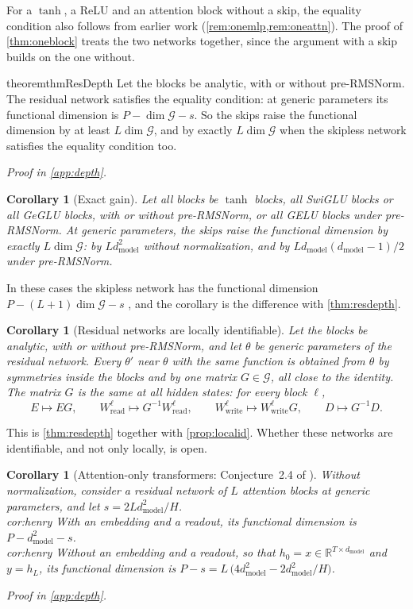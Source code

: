 \documentclass[10pt]{article}
\newtheorem{corollary}[theorem]{Corollary}
\theoremstyle{definition}
\theoremstyle{remark}
\newcommand{\R}{\mathbb{R}}
\newcommand{\Wread}{W_{\mathrm{read}}}
\newcommand{\Wwrite}{W_{\mathrm{write}}}
\newcommand{\dm}{d_{\mathrm{model}}}
\newcommand{\G}{\mathcal{G}}
\newcommand{\ptlabel}[1]{\phantomsection\label{#1}}
\newcommand{\proofin}[1]{\par\vspace{-0.4\baselineskip}\noindent\hfill{\small\itshape Proof in \cref{#1}.}\par\smallskip}
\newcommand{\stpart}[3]{\ifx\relax#1\relax\else\ptlabel{#1:#2}\fi{\upshape\bfseries\boldmath(#2)\ifx\relax#3\relax\else\ #3.\fi}}
\newcommand{\KDdepth}{5.2}    %
\begin{document}
For a $\tanh$, a ReLU and an attention block without a skip, the equality condition also follows from earlier work (\cref{rem:onemlp,rem:oneattn}). The proof of \cref{thm:oneblock} treats the two networks together, since the argument with a skip builds on the one without.

\begin{restatable}{theorem}{thmResDepth}\label{thm:resdepth}
Let the blocks be analytic, with or without pre-RMSNorm. The residual network satisfies the equality condition: at generic parameters its functional dimension is $P - \dim\G - s$. So the skips raise the functional dimension by at least $L\dim\G$, and by exactly $L\dim\G$ when the skipless network satisfies the equality condition too.
\end{restatable}
\proofin{app:depth}

\begin{corollary}[Exact gain]\label{cor:exactgain}
Let all blocks be $\tanh$ blocks, all SwiGLU blocks or all GeGLU blocks, with or without pre-RMSNorm, or all GELU blocks under pre-RMSNorm. At generic parameters, the skips raise the functional dimension by exactly $L\dim\G$: by $L\dm^2$ without normalization, and by $L\dm(\dm-1)/2$ under pre-RMSNorm.
\end{corollary}

In these cases the skipless network has the functional dimension $P - (L+1)\dim\G - s$ \citep[Theorem~\KDdepth]{karbevski2026dimension}, and the corollary is the difference with \cref{thm:resdepth}.

\begin{corollary}[Residual networks are locally identifiable]\label{cor:localid}
Let the blocks be analytic, with or without pre-RMSNorm, and let $\theta$ be generic parameters of the residual network. Every $\theta'$ near $\theta$ with the same function is obtained from $\theta$ by symmetries inside the blocks and by one matrix $G \in \G$, all close to the identity. The matrix $G$ is the same at all hidden states: for every block $\ell$,
\[
E \mapsto EG, \qquad \Wread^{\ell} \mapsto G^{-1}\Wread^{\ell}, \qquad \Wwrite^{\ell} \mapsto \Wwrite^{\ell}G, \qquad D \mapsto G^{-1}D.
\]
\end{corollary}

This is \cref{thm:resdepth} together with \cref{prop:localid}. Whether these networks are identifiable, and not only locally, is open.

\begin{corollary}[Attention-only transformers: Conjecture~2.4 of \citealp{henry2026generic}]\label{cor:henry}
Without normalization, consider a residual network of $L$ attention blocks at generic parameters, and let $s = 2L\dm^2/H$.\\
\stpart{cor:henry}{i}{} With an embedding and a readout, its functional dimension is $P - \dm^2 - s$.\\
\stpart{cor:henry}{ii}{} Without an embedding and a readout, so that $h_0 = x \in \R^{T\times\dm}$ and $y = h_L$, its functional dimension is $P - s = L\,\big(4\dm^2 - 2\dm^2/H\big)$.
\end{corollary}
\proofin{app:depth}
\end{document}
